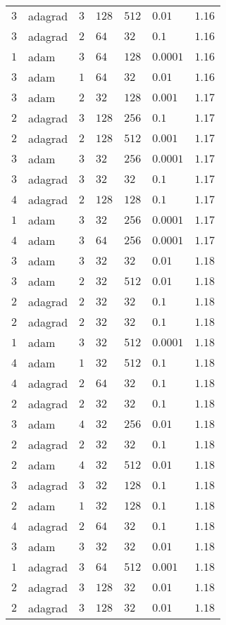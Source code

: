 \begin{table}[hb]
\begin{tabular}{lllllll}
    $3$ & adagrad & $3$ & $128$ & $512$ & $0.01$ & $1.16$ \\
    $3$ & adagrad & $2$ & $64$ & $32$ & $0.1$ & $1.16$ \\
    $1$ & adam & $3$ & $64$ & $128$ & $0.0001$ & $1.16$ \\
    $3$ & adam & $1$ & $64$ & $32$ & $0.01$ & $1.16$ \\
    $3$ & adam & $2$ & $32$ & $128$ & $0.001$ & $1.17$ \\
    $2$ & adagrad & $3$ & $128$ & $256$ & $0.1$ & $1.17$ \\
    $2$ & adagrad & $2$ & $128$ & $512$ & $0.001$ & $1.17$ \\
    $3$ & adam & $3$ & $32$ & $256$ & $0.0001$ & $1.17$ \\
    $3$ & adagrad & $3$ & $32$ & $32$ & $0.1$ & $1.17$ \\
    $4$ & adagrad & $2$ & $128$ & $128$ & $0.1$ & $1.17$ \\
    $1$ & adam & $3$ & $32$ & $256$ & $0.0001$ & $1.17$ \\
    $4$ & adam & $3$ & $64$ & $256$ & $0.0001$ & $1.17$ \\
    $3$ & adam & $3$ & $32$ & $32$ & $0.01$ & $1.18$ \\
    $3$ & adam & $2$ & $32$ & $512$ & $0.01$ & $1.18$ \\
    $2$ & adagrad & $2$ & $32$ & $32$ & $0.1$ & $1.18$ \\
    $2$ & adagrad & $2$ & $32$ & $32$ & $0.1$ & $1.18$ \\
    $1$ & adam & $3$ & $32$ & $512$ & $0.0001$ & $1.18$ \\
    $4$ & adam & $1$ & $32$ & $512$ & $0.1$ & $1.18$ \\
    $4$ & adagrad & $2$ & $64$ & $32$ & $0.1$ & $1.18$ \\
    $2$ & adagrad & $2$ & $32$ & $32$ & $0.1$ & $1.18$ \\
    $3$ & adam & $4$ & $32$ & $256$ & $0.01$ & $1.18$ \\
    $2$ & adagrad & $2$ & $32$ & $32$ & $0.1$ & $1.18$ \\
    $2$ & adam & $4$ & $32$ & $512$ & $0.01$ & $1.18$ \\
    $3$ & adagrad & $3$ & $32$ & $128$ & $0.1$ & $1.18$ \\
    $2$ & adam & $1$ & $32$ & $128$ & $0.1$ & $1.18$ \\
    $4$ & adagrad & $2$ & $64$ & $32$ & $0.1$ & $1.18$ \\
    $3$ & adam & $3$ & $32$ & $32$ & $0.01$ & $1.18$ \\
    $1$ & adagrad & $3$ & $64$ & $512$ & $0.001$ & $1.18$ \\
    $2$ & adagrad & $3$ & $128$ & $32$ & $0.01$ & $1.18$ \\
    $2$ & adagrad & $3$ & $128$ & $32$ & $0.01$ & $1.18$ \\
    \bottomrule
    \end{tabular}
\end{table}